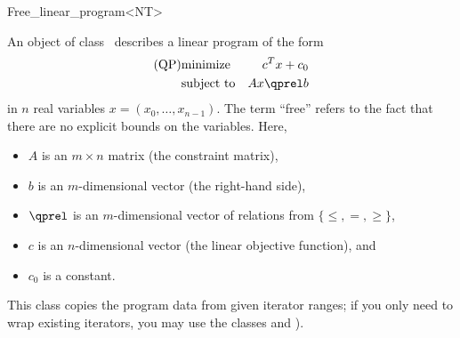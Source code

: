 \begin{ccRefClass}{Free_linear_program<NT>}


\ccDefinition
An object of class \ccRefName\ describes a linear program of the form
\begin{eqnarray*}
\mbox{(QP)}& \mbox{minimize} & c^{T}x+c_0 \\
&\mbox{subject to}   & Ax\qprel b
\end{eqnarray*}
in $n$ real variables $x=(x_0,\ldots,x_{n-1})$. The term ``free'' refers
to the fact that there are no explicit bounds on the variables.
Here, 
\begin{itemize}
\item $A$ is an $m\times n$ matrix (the constraint matrix), 
\item $b$ is an $m$-dimensional vector (the right-hand side),
\item $\qprel$ is an $m$-dimensional vector of relations 
from $\{\leq, =, \geq\}$, 
\item $c$ is an $n$-dimensional vector (the linear objective
  function), and 
\item $c_0$ is a constant.
\end{itemize}

This class copies the program data from given iterator ranges; 
if you only need to wrap existing iterators, you may use the classes 
 and ).

\ccIsModel
{}

\ccCreation
\ccIndexClassCreation
{}


\ccSeeAlso
{}\\


\end{ccRefClass}
